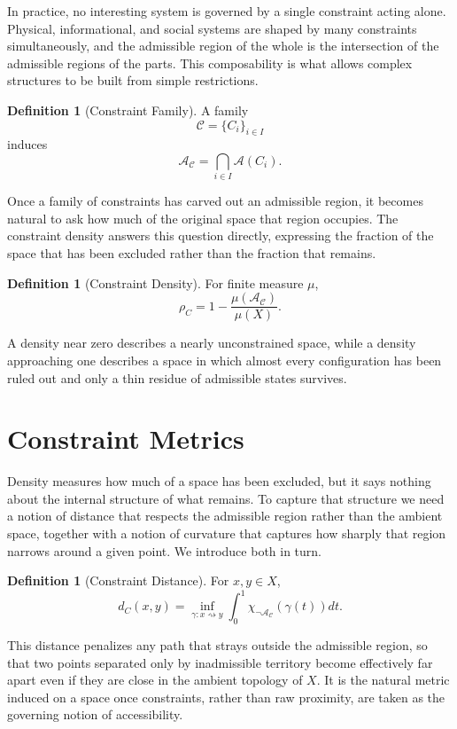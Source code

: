 \documentclass[11pt,oneside]{book}
\theoremstyle{plain}
\theoremstyle{definition}
\newtheorem{definition}[theorem]{Definition}
\theoremstyle{remark}
\begin{document}
In practice, no interesting system is governed by a single constraint acting alone. Physical, informational, and social systems are shaped by many constraints simultaneously, and the admissible region of the whole is the intersection of the admissible regions of the parts. This composability is what allows complex structures to be built from simple restrictions.

\begin{definition}[Constraint Family]
A family
\[
\mathcal{C}
=
\{C_i\}_{i\in I}
\]
induces
\[
\mathcal{A}_{\mathcal C}
=
\bigcap_{i\in I}\mathcal A(C_i).
\]
\end{definition}

Once a family of constraints has carved out an admissible region, it becomes natural to ask how much of the original space that region occupies. The constraint density answers this question directly, expressing the fraction of the space that has been excluded rather than the fraction that remains.

\begin{definition}[Constraint Density]
For finite measure
\(\mu\),
\[
\rho_C
=
1-
\frac{\mu(\mathcal A_{\mathcal C})}
     {\mu(X)}.
\]
\end{definition}

A density near zero describes a nearly unconstrained space, while a density approaching one describes a space in which almost every configuration has been ruled out and only a thin residue of admissible states survives.

\section{Constraint Metrics}

Density measures how much of a space has been excluded, but it says nothing about the internal structure of what remains. To capture that structure we need a notion of distance that respects the admissible region rather than the ambient space, together with a notion of curvature that captures how sharply that region narrows around a given point. We introduce both in turn.

\begin{definition}[Constraint Distance]
For
\(x,y\in X\),
\[
d_C(x,y)
=
\inf_{\gamma:x\rightsquigarrow y}
\int_0^1
\chi_{\neg\mathcal A_{\mathcal C}}
(\gamma(t))
dt.
\]
\end{definition}

This distance penalizes any path that strays outside the admissible region, so that two points separated only by inadmissible territory become effectively far apart even if they are close in the ambient topology of \(X\). It is the natural metric induced on a space once constraints, rather than raw proximity, are taken as the governing notion of accessibility.
\end{document}
